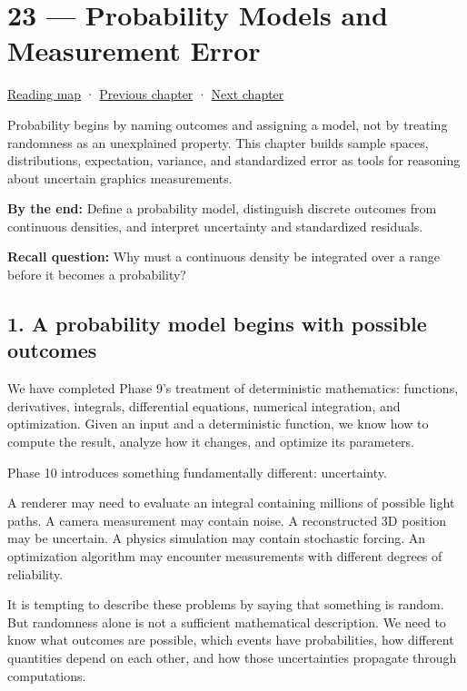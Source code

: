 \hypertarget{02-foundations-ii-ch023}{}
\chapter{23 --- Probability Models and Measurement Error}\label{02-foundations-ii-ch023-probability-models-and-measurement-error}

\hyperref[volume-reading-map]{Reading map} · \hyperref[02-foundations-ii-ch022-accumulation-quadrature-and-the-bridge-to-probability]{Previous chapter} · \hyperref[02-foundations-ii-ch024-waiting-times-covariance-and-matrix-decomposition]{Next chapter}

Probability begins by naming outcomes and assigning a model, not by treating randomness as an unexplained property. This chapter builds sample spaces, distributions, expectation, variance, and standardized error as tools for reasoning about uncertain graphics measurements.

\textbf{By the end:} Define a probability model, distinguish discrete outcomes from continuous densities, and interpret uncertainty and standardized residuals.

\textbf{Recall question:} Why must a continuous density be integrated over a range before it becomes a probability?

\section{1. A probability model begins with possible outcomes}\label{02-foundations-ii-ch023-a-probability-model-begins-with-possible-outcomes}

We have completed Phase 9's treatment of deterministic mathematics: functions, derivatives, integrals, differential equations, numerical integration, and optimization. Given an input and a deterministic function, we know how to compute the result, analyze how it changes, and optimize its parameters.

Phase 10 introduces something fundamentally different: uncertainty.

A renderer may need to evaluate an integral containing millions of possible light paths. A camera measurement may contain noise. A reconstructed 3D position may be uncertain. A physics simulation may contain stochastic forcing. An optimization algorithm may encounter measurements with different degrees of reliability.

It is tempting to describe these problems by saying that something is random. But randomness alone is not a sufficient mathematical description. We need to know what outcomes are possible, which events have probabilities, how different quantities depend on each other, and how those uncertainties propagate through computations.

